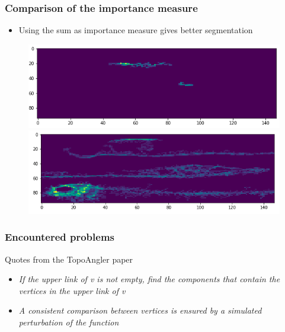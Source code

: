 \documentclass[9pt]{beamer}
\begin{document}
\begin{frame}
\frametitle{Comparison of the importance measure}
\begin{block}{}
\begin{itemize}
\item Using the sum as importance measure gives better segmentation
\end{itemize}
\end{block}
\begin{figure}
\centering
\begin{minipage}{.5\textwidth}
  \centering
  \includegraphics[scale=0.25]{Images/max_3_separation}
\end{minipage}%
\begin{minipage}{.5\textwidth}
  \centering
  \includegraphics[scale=0.27]{Images/3_fishes_separation}
\end{minipage}
\end{figure}
\end{frame}

\begin{frame}
\frametitle{Encountered problems}
\begin{block}{Quotes from the TopoAngler paper}
\begin{itemize}
\item \textit{If the upper link of v is not empty, find the components that
contain the vertices in the upper link of v}
\item \textit{A consistent comparison between vertices is ensured by a simulated perturbation of the function}
\end{itemize}
\end{block}
\end{frame}
\end{document}
